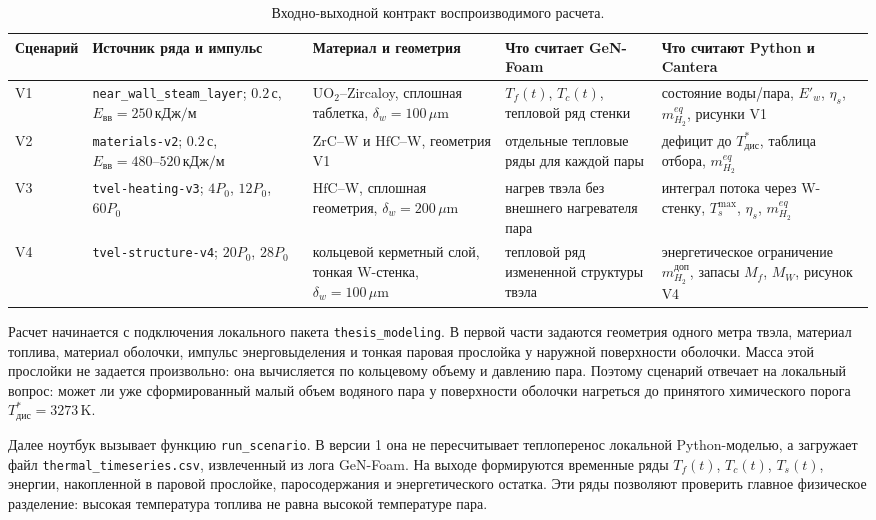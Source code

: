 \documentclass[12pt]{article}
\begin{document}
\begin{table}[H]
    \centering
    \footnotesize
    \caption{Входно-выходной контракт воспроизводимого расчета.}
    \label{tab:reproducibilityContract}
    \begin{tabularx}{\textwidth}{@{}p{}p{}p{}X X@{}}
        \toprule
        Сценарий & Источник ряда и импульс & Материал и геометрия & Что считает GeN-Foam & Что считают Python и Cantera\\
        \midrule
        V1 & \texttt{near\_wall\_steam\_layer}; \(0.2\,\mathrm{с}\), \(E_{\mathrm{вв}}=250\,\mathrm{кДж/м}\) & \(\mathrm{UO_2}\)--Zircaloy, сплошная таблетка, \(\delta_w=100\,\mu\mathrm{m}\) & \(T_f(t)\), \(T_c(t)\), тепловой ряд стенки & состояние воды/пара, \(E'_w\), \(\eta_s\), \(m_{H_2}^{eq}\), рисунки V1\\
        V2 & \texttt{materials-v2}; \(0.2\,\mathrm{с}\), \(E_{\mathrm{вв}}=480\text{--}520\,\mathrm{кДж/м}\) & \(\mathrm{ZrC}\)--W и \(\mathrm{HfC}\)--W, геометрия V1 & отдельные тепловые ряды для каждой пары & дефицит до \(T^*_{\mathrm{дис}}\), таблица отбора, \(m_{H_2}^{eq}\)\\
        V3 & \texttt{tvel-heating-v3}; \(4P_0\), \(12P_0\), \(60P_0\) & \(\mathrm{HfC}\)--W, сплошная геометрия, \(\delta_w=200\,\mu\mathrm{m}\) & нагрев твэла без внешнего нагревателя пара & интеграл потока через W-стенку, \(T_s^{\max}\), \(\eta_s\), \(m_{H_2}^{eq}\)\\
        V4 & \texttt{tvel-structure-v4}; \(20P_0\), \(28P_0\) & кольцевой керметный слой, тонкая W-стенка, \(\delta_w=100\,\mu\mathrm{m}\) & тепловой ряд измененной структуры твэла & энергетическое ограничение \(m_{H_2}^{\mathrm{доп}}\), запасы \(M_f\), \(M_W\), рисунок V4\\
        \bottomrule
    \end{tabularx}
\end{table}

Расчет начинается с подключения локального пакета \texttt{thesis\_modeling}. В первой части задаются геометрия одного метра твэла, материал топлива, материал оболочки, импульс энерговыделения и тонкая паровая прослойка у наружной поверхности оболочки. Масса этой прослойки не задается произвольно: она вычисляется по кольцевому объему и давлению пара. Поэтому сценарий отвечает на локальный вопрос: может ли уже сформированный малый объем водяного пара у поверхности оболочки нагреться до принятого химического порога \(T^*_{\mathrm{дис}}=3273\,\mathrm{K}\).

Далее ноутбук вызывает функцию \texttt{run\_scenario}. В версии 1 она не пересчитывает теплоперенос локальной Python-моделью, а загружает файл \texttt{thermal\_timeseries.csv}, извлеченный из лога GeN-Foam. На выходе формируются временные ряды \(T_f(t)\), \(T_c(t)\), \(T_s(t)\), энергии, накопленной в паровой прослойке, паросодержания и энергетического остатка. Эти ряды позволяют проверить главное физическое разделение: высокая температура топлива не равна высокой температуре пара.
\end{document}
